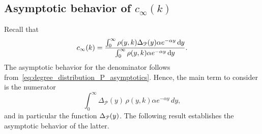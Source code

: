 \subsection{Asymptotic behavior of $c_\infty(k)$}\label{ssec:asymptotics_local_clustering_P}

%

Recall that
\[
	c_\infty(k) = \frac{\int_0^\infty \rho(y,k) \Delta_{{\mathcal P}}(y) \alpha e^{-\alpha y} \operatorname{\mathrm{d}\hspace{-2pt}} y}{\int_0^\infty \rho(y,k) \alpha e^{-\alpha y} \operatorname{\mathrm{d}\hspace{-2pt}} y}.
\]
The asymptotic behavior for the denominator follows from~\eqref{eq:degree_distribution_P_asymptotics}. Hence, the main term to consider is the numerator
\[
	\int_0^{\infty} \Delta_{\mathcal{P}}(y) \, \rho(y,k) \alpha e^{-\alpha y} \, dy,
\]
and in particular the function $\Delta_{{\mathcal P}}(y)$. The following result establishes the asymptotic behavior of the latter.

